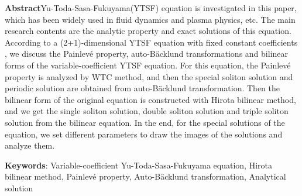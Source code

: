 \documentclass[11pt,a4paper]{ctexart}
\begin{document}
\noindent \textbf{Abstract}Yu-Toda-Sasa-Fukuyama(YTSF) equation is investigated in this paper, which has been widely used in fluid dynamics and plasma physics, etc. The main research contents are the analytic property and exact solutions of this equation. According to a (2+1)-dimensional YTSF equation with fixed constant coefficients , we discuss the Painlev\'{e} property, auto-B\"{a}cklund transformations and bilinear forms of the variable-coefficient YTSF equation. For this equation, the Painlev\'{e} property is analyzed by WTC method, and then the special soliton solution and periodic solution are obtained from auto-B\"{a}cklund transformation. Then the bilinear form of the original equation is constructed with Hirota bilinear method, and we get the single soliton solution, double soliton solution and triple soliton solution from the bilinear equation. In the end, for the special solutions of the equation, we set different parameters to draw the images of the solutions and analyze them.

\noindent \textbf{Keywords}: Variable-coefficient Yu-Toda-Sasa-Fukuyama equation, Hirota bilinear method, Painlev\'{e} property, Auto-B\"{a}cklund transformation, Analytical solution
\end{document}
